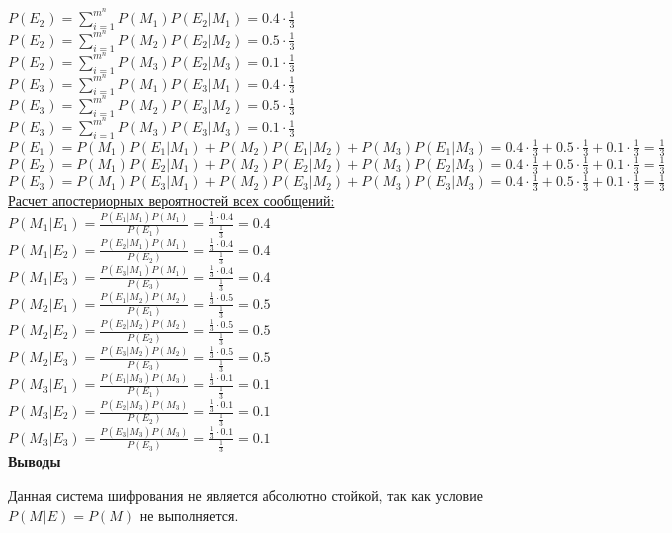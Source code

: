 \documentclass[a4paper,14pt]{extarticle}
\begin{document}
    $P(E_2)=\sum\limits_{i=1}^{m^n} P(M_1)P(E_2|M_1) = 0.4\cdot\frac{1}{3}$\\
    $P(E_2)=\sum\limits_{i=1}^{m^n} P(M_2)P(E_2|M_2) = 0.5\cdot\frac{1}{3}$\\
    $P(E_2)=\sum\limits_{i=1}^{m^n} P(M_3)P(E_2|M_3) = 0.1\cdot\frac{1}{3}$\\
    $P(E_3)=\sum\limits_{i=1}^{m^n} P(M_1)P(E_3|M_1) = 0.4\cdot\frac{1}{3}$\\
    $P(E_3)=\sum\limits_{i=1}^{m^n} P(M_2)P(E_3|M_2) = 0.5\cdot\frac{1}{3}$\\
    $P(E_3)=\sum\limits_{i=1}^{m^n} P(M_3)P(E_3|M_3) = 0.1\cdot\frac{1}{3}$\\
    \noindent$P(E_1)=P(M_1)P(E_1|M_1)+P(M_2)P(E_1|M_2)+P(M_3)P(E_1|M_3)=0.4\cdot\frac{1}{3}+0.5\cdot\frac{1}{3}+0.1\cdot\frac{1}{3}=\frac{1}{3}$\\
    $P(E_2)=P(M_1)P(E_2|M_1)+P(M_2)P(E_2|M_2)+P(M_3)P(E_2|M_3)=0.4\cdot\frac{1}{3}+0.5\cdot\frac{1}{3}+0.1\cdot\frac{1}{3}=\frac{1}{3}$\\
    $P(E_3)=P(M_1)P(E_3|M_1)+P(M_2)P(E_3|M_2)+P(M_3)P(E_3|M_3)=0.4\cdot\frac{1}{3}+0.5\cdot\frac{1}{3}+0.1\cdot\frac{1}{3}=\frac{1}{3}$\\
    \underline{Расчет апостериорных вероятностей всех сообщений:}\\
    \noindent$P(M_1|E_1)=\frac{P(E_1|M_1)P(M_1)}{P(E_1)}=\frac{\frac{1}{3}\cdot0.4}{\frac{1}{3}}=0.4$\\
    $P(M_1|E_2)=\frac{P(E_2|M_1)P(M_1)}{P(E_2)}=\frac{\frac{1}{3}\cdot0.4}{\frac{1}{3}}=0.4$\\
    $P(M_1|E_3)=\frac{P(E_3|M_1)P(M_1)}{P(E_3)}=\frac{\frac{1}{3}\cdot0.4}{\frac{1}{3}}=0.4$\\
    $P(M_2|E_1)=\frac{P(E_1|M_2)P(M_2)}{P(E_1)}=\frac{\frac{1}{3}\cdot0.5}{\frac{1}{3}}=0.5$\\
    $P(M_2|E_2)=\frac{P(E_2|M_2)P(M_2)}{P(E_2)}=\frac{\frac{1}{3}\cdot0.5}{\frac{1}{3}}=0.5$\\
    $P(M_2|E_3)=\frac{P(E_3|M_2)P(M_2)}{P(E_3)}=\frac{\frac{1}{3}\cdot0.5}{\frac{1}{3}}=0.5$\\
    $P(M_3|E_1)=\frac{P(E_1|M_3)P(M_3)}{P(E_1)}=\frac{\frac{1}{3}\cdot0.1}{\frac{1}{3}}=0.1$\\
    $P(M_3|E_2)=\frac{P(E_2|M_3)P(M_3)}{P(E_2)}=\frac{\frac{1}{3}\cdot0.1}{\frac{1}{3}}=0.1$\\
    $P(M_3|E_3)=\frac{P(E_3|M_3)P(M_3)}{P(E_3)}=\frac{\frac{1}{3}\cdot0.1}{\frac{1}{3}}=0.1$\\
    \textbf{Выводы}

    Данная система шифрования не является абсолютно стойкой, так как условие $P(M|E)=P(M)$ не выполняется.
\end{document}
